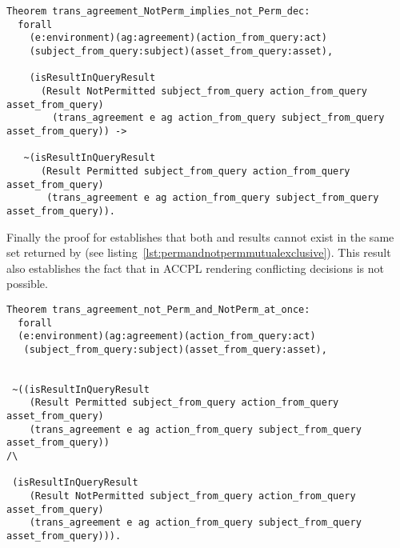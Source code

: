 \begin{lstlisting}
Theorem trans_agreement_NotPerm_implies_not_Perm_dec:
  forall
    (e:environment)(ag:agreement)(action_from_query:act)
    (subject_from_query:subject)(asset_from_query:asset),

    (isResultInQueryResult 
      (Result NotPermitted subject_from_query action_from_query asset_from_query)
        (trans_agreement e ag action_from_query subject_from_query asset_from_query)) ->

   ~(isResultInQueryResult 
      (Result Permitted subject_from_query action_from_query asset_from_query)
       (trans_agreement e ag action_from_query subject_from_query asset_from_query)).
\end{lstlisting}

Finally the proof for  establishes that both  and  results cannot exist in the same set returned by  (see listing~\ref{lst:permandnotpermmutualexclusive}). This result also establishes the fact that in \ac{ACCPL} rendering conflicting decisions is not possible. 

\begin{lstlisting}
Theorem trans_agreement_not_Perm_and_NotPerm_at_once:
  forall
  (e:environment)(ag:agreement)(action_from_query:act)
   (subject_from_query:subject)(asset_from_query:asset),


 ~((isResultInQueryResult 
    (Result Permitted subject_from_query action_from_query asset_from_query)
    (trans_agreement e ag action_from_query subject_from_query asset_from_query)) 
/\

 (isResultInQueryResult 
    (Result NotPermitted subject_from_query action_from_query asset_from_query)
    (trans_agreement e ag action_from_query subject_from_query asset_from_query))).

\end{lstlisting}

